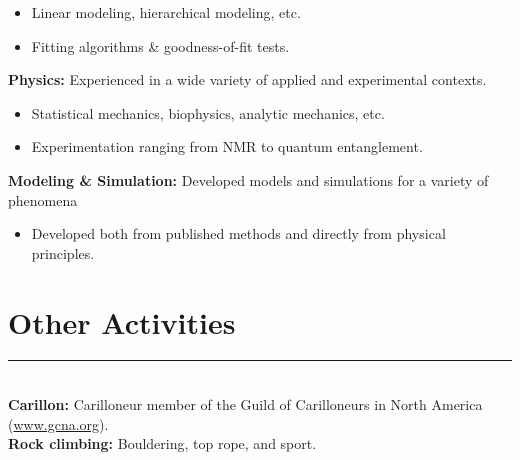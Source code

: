 \documentclass[margin]{res}
\begin{document}
\begin{resume}
\begin{itemize}
  \item Linear modeling, hierarchical modeling, etc.
  \item Fitting algorithms \& goodness-of-fit tests. \end{itemize} \vspace{-8pt}
{\bf Physics:} Experienced in a wide variety of applied and experimental contexts.\begin{itemize} \itemsep -2pt
\item Statistical mechanics, biophysics, analytic mechanics, etc. \item Experimentation ranging from NMR to quantum entanglement. \end{itemize}\vspace{-8pt}
{\bf Modeling \& Simulation:} Developed models and simulations for a variety of phenomena
\begin{itemize} \itemsep -2pt
  \item Developed both from published methods and directly from physical principles. \end{itemize}
\vspace{1pt}\section{Other Activities} \vspace{-15pt} \rule{\textwidth}{0.5pt} \\[3pt]
{\bf Carillon:} Carilloneur member of the Guild of Carilloneurs in North America (\url{www.gcna.org}). \\[3pt]
{\bf Rock climbing:} Bouldering, top rope, and sport.

\end{resume}
\end{document}
